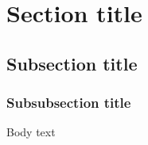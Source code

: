 \documentclass[10pt,a4paper,twoside,onecolumn]{article}
\begin{document}


\cleardoublepage
\setcounter{page}{1}

\section{Section title}
\subsection{Subsection title}
\subsubsection{Subsubsection title}
Body text
\end{document}
